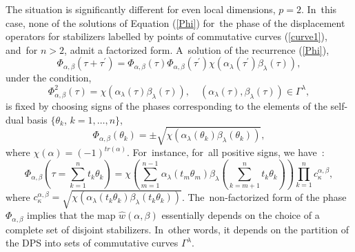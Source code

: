\documentclass[quantumrep,article,accept,pdftex,moreauthors]{Definitions/mdpi}
\begin{document}
The situation is significantly different for even local dimensions, $p=2$. In~this case, none of the solutions of Equation (\ref{Phi}) for~the phase of the
displacement operators for stabilizers labelled by points of commutative curves
(\ref{curve1}), and~for $n > 2$, admit a factorized form. A~solution of the
recurrence (\ref{Phi}),
\begin{equation}
  \Phi_{\alpha,\beta}\left(\tau+\tau^{\prime}\right)
  = \Phi_{\alpha,\beta}(\tau) \Phi_{\alpha,\beta }(\tau^{\prime})
  \chi\left( \alpha_{\lambda}(\tau^{\prime}) \beta_{\lambda}(\tau) \right),
  \label{phase 2}
\end{equation}
under the condition,
\begin{equation*}
  \Phi_{\alpha,\beta}^{2}(\tau)
  = \chi\left( \alpha_{\lambda}(\tau) \beta_{\lambda}(\tau ) \right),
  \quad \left(\alpha_{\lambda}(\tau), \beta_{\lambda}(\tau)\right)
  \in \Gamma^{\lambda},
\end{equation*}
is fixed by choosing signs of the phases corresponding to the elements of the
self-dual basis $\{\theta_{k}$, $k=1,\ldots,n\}$,
\begin{equation}
  \Phi_{\alpha,\beta}(\theta_{k})
  = \pm \sqrt{\chi\left(
    \alpha_{\lambda}(\theta_{k})\beta_{\lambda }(\theta_{k})
  \right)},
  \label{Phib}
\end{equation}
where $\chi(\alpha)=(-1)^{tr(\alpha)}$. For~instance, for~all positive signs, we
have~\cite{klimov06}:
\begin{equation}
  \Phi_{\alpha,\beta}\left(
    \tau = \sum\limits_{k=1}^{n}t_{k}\theta_{k}
  \right)
  = \chi\left(
    \sum\limits_{m=1}^{n-1} \alpha_{\lambda}(t_{m}\theta _{m})\beta_{\lambda}
    \left( \sum\limits_{k=m+1}^{n} t_{k} \theta_{k} \right)
  \right)
  \prod\limits_{k=1}^{n}c_{\kappa }^{\alpha,\beta },
  \label{Phi G}
\end{equation}
where $c_{\kappa}^{\alpha,\beta}=\sqrt{\chi\left(
\alpha_{\lambda}(t_{k}\theta_{k})\beta_{\lambda}\left(t_{k}\theta_{k}\right)
\right)}$. The~non-factorized form of the phase $\Phi_{\alpha,\beta}$ implies
that the map $\hat{w}(\alpha,\beta)$ essentially depends on the choice of a
complete set of disjoint stabilizers. In~other words, it depends on the
partition of the DPS into sets of commutative curves $\Gamma^{\lambda}$.
\end{document}
